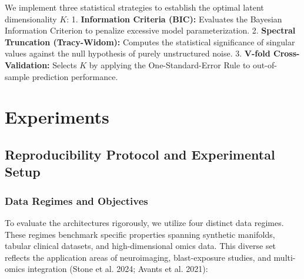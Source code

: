 \documentclass[
  letterpaper,
]{report}
\begin{document}
We implement three statistical strategies to establish the optimal
latent dimensionality \(K\): 1. \textbf{Information Criteria (BIC):}
Evaluates the Bayesian Information Criterion to penalize excessive model
parameterization. 2. \textbf{Spectral Truncation (Tracy-Widom):}
Computes the statistical significance of singular values against the
null hypothesis of purely unstructured noise. 3. \textbf{V-fold
Cross-Validation:} Selects \(K\) by applying the One-Standard-Error Rule
to out-of-sample prediction performance.


\chapter{Experiments}\label{experiments}

\section{Reproducibility Protocol and Experimental
Setup}\label{reproducibility-protocol-and-experimental-setup}

\subsection{Data Regimes and
Objectives}\label{data-regimes-and-objectives}

To evaluate the architectures rigorously, we utilize four distinct data
regimes. These regimes benchmark specific properties spanning synthetic
manifolds, tabular clinical datasets, and high-dimensional omics data.
This diverse set reflects the application areas of neuroimaging,
blast-exposure studies, and multi-omics integration ({Stone et al.}
2024; Avants et al. 2021):
\end{document}
